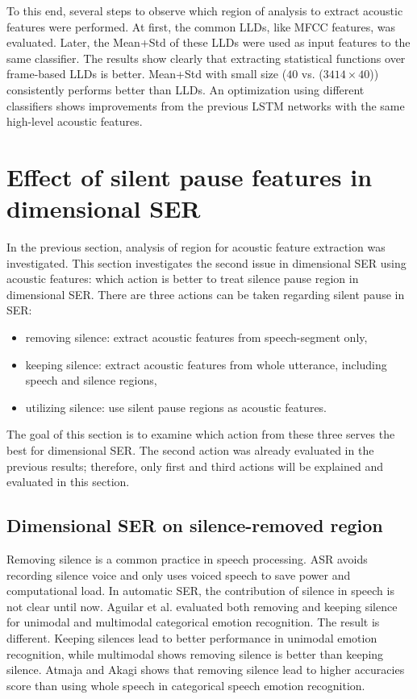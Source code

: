 To this end, several steps to observe which region of analysis to extract
acoustic features were performed. At first, the common LLDs, like MFCC
features, was evaluated. Later, the Mean+Std of these LLDs were used as input
features to the same classifier. The results show clearly that extracting
statistical functions over frame-based LLDs is better. Mean+Std with small size
($40$ vs. ($3414 \times 40$)) consistently performs better than LLDs. An
optimization using different classifiers shows improvements from the previous
LSTM networks with the same high-level acoustic features. 

\section{Effect of silent pause features in dimensional SER}
In the previous section, analysis of region for acoustic feature extraction was
investigated. This section investigates the second issue in dimensional SER
using acoustic features: which action is better to treat silence pause region
in dimensional SER. There are three actions can be taken regarding silent pause
in SER:
\begin{itemize}
  \item removing silence: extract acoustic features from speech-segment only,
\item keeping silence: extract acoustic features from whole utterance,
including speech and silence regions,
  \item utilizing silence: use silent pause regions as acoustic features.
\end{itemize}
The goal of this section is to examine which action from these three serves the
best for dimensional SER. The second action was already evaluated in the
previous results; therefore, only first and third actions will be explained and
evaluated in this section.

\subsection{Dimensional SER on silence-removed region}
Removing silence is a common practice in speech processing. ASR avoids
recording silence voice and only uses voiced speech to save power and
computational load. In automatic SER, the contribution of silence in speech is
not clear until now. Aguilar et al. \cite{Aguilar2020} evaluated both removing
and keeping silence for unimodal and multimodal categorical emotion
recognition. The result is different.  Keeping silences lead to better
performance in unimodal emotion recognition, while multimodal shows removing
silence is better than keeping silence. Atmaja and Akagi \cite{Atmaja2019}
shows that removing silence lead to higher accuracies score than using whole
speech in categorical speech emotion recognition. 

